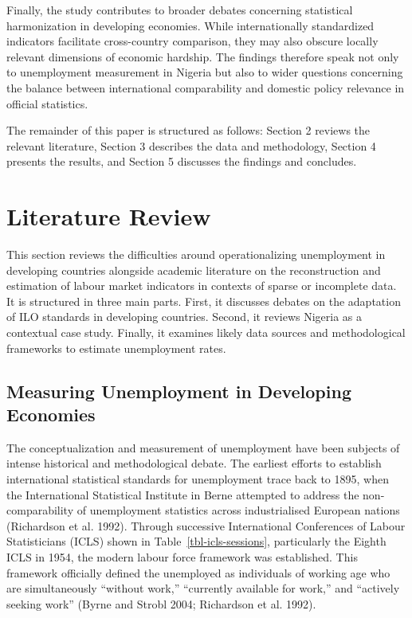 \documentclass[
  letterpaper,
  DIV=11,
  numbers=noendperiod]{scrartcl}
\begin{document}
Finally, the study contributes to broader debates concerning statistical
harmonization in developing economies. While internationally
standardized indicators facilitate cross-country comparison, they may
also obscure locally relevant dimensions of economic hardship. The
findings therefore speak not only to unemployment measurement in Nigeria
but also to wider questions concerning the balance between international
comparability and domestic policy relevance in official statistics.

The remainder of this paper is structured as follows: Section 2 reviews
the relevant literature, Section 3 describes the data and methodology,
Section 4 presents the results, and Section 5 discusses the findings and
concludes.

\section{Literature Review}\label{literature-review}

This section reviews the difficulties around operationalizing
unemployment in developing countries alongside academic literature on
the reconstruction and estimation of labour market indicators in
contexts of sparse or incomplete data. It is structured in three main
parts. First, it discusses debates on the adaptation of ILO standards in
developing countries. Second, it reviews Nigeria as a contextual case
study. Finally, it examines likely data sources and methodological
frameworks to estimate unemployment rates.

\subsection{Measuring Unemployment in Developing
Economies}\label{measuring-unemployment-in-developing-economies}

The conceptualization and measurement of unemployment have been subjects
of intense historical and methodological debate. The earliest efforts to
establish international statistical standards for unemployment trace
back to 1895, when the International Statistical Institute in Berne
attempted to address the non-comparability of unemployment statistics
across industrialised European nations (Richardson et al. 1992). Through
successive International Conferences of Labour Statisticians (ICLS)
shown in Table~\ref{tbl-icls-sessions}, particularly the Eighth ICLS in
1954, the modern labour force framework was established. This framework
officially defined the unemployed as individuals of working age who are
simultaneously ``without work,'' ``currently available for work,'' and
``actively seeking work'' (Byrne and Strobl 2004; Richardson et al.
1992).
\end{document}
